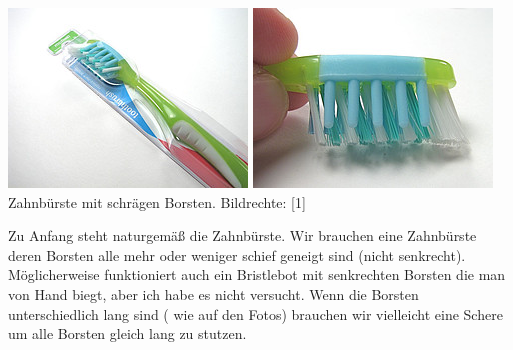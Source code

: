 \begin{center}
\includegraphics[width=\linewidth]{bristlebot/bristlebot2.jpg}
\includegraphics[width=\linewidth]{bristlebot/bristlebot3.jpg}\\
\footnotesize{Zahnbürste mit schrägen Borsten. Bildrechte: [1]}
\end{center}

Zu Anfang steht naturgemäß die Zahnbürste. Wir brauchen eine Zahnbürste deren Borsten alle mehr oder weniger schief geneigt sind (nicht senkrecht). Möglicherweise funktioniert auch ein Bristlebot mit senkrechten Borsten die man von Hand biegt, aber ich habe es nicht versucht. Wenn die Borsten unterschiedlich lang sind ( wie auf den Fotos) brauchen wir vielleicht eine Schere um alle Borsten gleich lang zu stutzen. \\
 
